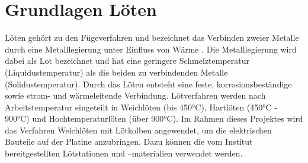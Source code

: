 \section{Grundlagen Löten}
Löten gehört zu den Fügeverfahren und bezeichnet das Verbinden zweier Metalle durch eine Metalllegierung unter Einfluss von Wärme \cite{loeten}. Die Metalllegierung wird dabei als Lot bezeichnet und hat eine geringere Schmelztemperatur (Liquidustemperatur) als die beiden zu verbindenden Metalle (Solidustemperatur). Durch das Löten entsteht eine feste, korrosionsbeständige sowie strom- und wärmeleitende Verbindung. Lötverfahren werden nach Arbeitstemperatur eingeteilt in Weichlöten (bis 450°C), Hartlöten (450°C - 900°C) und Hochtemperaturlöten (über 900°C). Im Rahmen dieses Projektes wird das Verfahren Weichlöten mit Lötkolben angewendet, um die elektrischen Bauteile auf der Platine anzubringen. Dazu können die vom Institut bereitgestellten Lötstationen und –materialien verwendet werden. 


